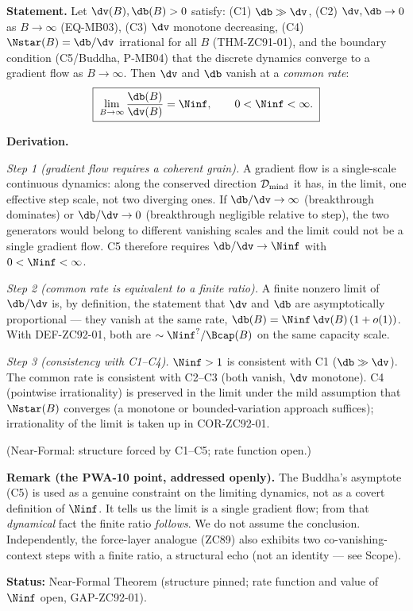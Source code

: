 \documentclass[12pt, a4paper]{article}
\begin{document}
\begin{formalbox}[title={THM-ZC92-01: Common-Rate Theorem
  ($R_0$, Near-Formal)}]

\textbf{Statement.} Let $\dv(B),\db(B)>0$ satisfy: (C1) $\db\gg\dv$,
(C2) $\dv,\db\to0$ as $B\to\infty$ (EQ-MB03), (C3) $\dv$ monotone
decreasing, (C4) $\Nstar(B)=\db/\dv$ irrational for all $B$
(THM-ZC91-01), and the boundary condition (C5/Buddha, P-MB04) that the
discrete dynamics converge to a gradient flow as $B\to\infty$. Then
$\dv$ and $\db$ vanish at a \emph{common rate}:
\begin{equation}
  \boxed{\;
  \lim_{B\to\infty}\frac{\db(B)}{\dv(B)}=\Ninf,\qquad
  0<\Ninf<\infty.\;}
  \label{eq:thm-zc92}
\end{equation}

\textbf{Derivation.}

\textit{Step 1 (gradient flow requires a coherent grain).} A gradient
flow is a single-scale continuous dynamics: along the conserved direction
$\mathcal{D}_{\rm mind}$ it has, in the limit, one effective step scale,
not two diverging ones. If $\db/\dv\to\infty$ (breakthrough dominates) or
$\db/\dv\to0$ (breakthrough negligible relative to step), the two
generators would belong to different vanishing scales and the limit could
not be a single gradient flow. C5 therefore requires
$\db/\dv\to\Ninf$ with $0<\Ninf<\infty$.

\textit{Step 2 (common rate is equivalent to a finite ratio).} A finite
nonzero limit of $\db/\dv$ is, by definition, the statement that $\dv$ and
$\db$ are asymptotically proportional --- they vanish at the same rate,
$\db(B)=\Ninf\,\dv(B)\,(1+o(1))$. With DEF-ZC92-01, both are
$\sim\Ninf^{?}/\Bcap(B)$ on the same capacity scale.

\textit{Step 3 (consistency with C1--C4).} $\Ninf>1$ is consistent with
C1 ($\db\gg\dv$). The common rate is consistent with C2--C3 (both vanish,
$\dv$ monotone). C4 (pointwise irrationality) is preserved in the limit
under the mild assumption that $\Nstar(B)$ converges (a monotone or
bounded-variation approach suffices); irrationality of the limit is taken
up in COR-ZC92-01.

\hfill (Near-Formal: structure forced by C1--C5; rate function open.)

\textbf{Remark (the PWA-10 point, addressed openly).} The Buddha's
asymptote (C5) is used as a genuine constraint on the limiting dynamics,
not as a covert definition of $\Ninf$. It tells us the limit is a single
gradient flow; from that \emph{dynamical} fact the finite ratio
\emph{follows}. We do not assume the conclusion. Independently, the
force-layer analogue (ZC89) also exhibits two co-vanishing-context steps
with a finite ratio, a structural echo (not an identity --- see Scope).


\textbf{Status:} Near-Formal Theorem (structure pinned; rate function and
value of $\Ninf$ open, GAP-ZC92-01).
\end{formalbox}
\end{document}
